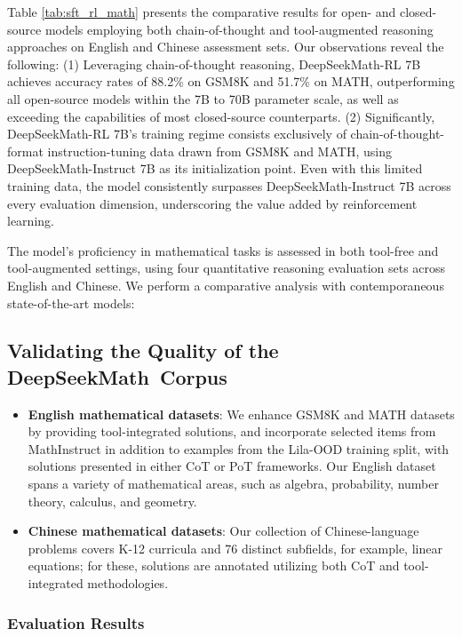 \begin{itemize}[topsep=0pt]
Table \ref{tab:sft_rl_math} presents the comparative results for open- and closed-source models employing both chain-of-thought and tool-augmented reasoning approaches on English and Chinese assessment sets. Our observations reveal the following: (1) Leveraging chain-of-thought reasoning, DeepSeekMath-RL 7B achieves accuracy rates of 88.2\% on GSM8K and 51.7\% on MATH, outperforming all open-source models within the 7B to 70B parameter scale, as well as exceeding the capabilities of most closed-source counterparts. (2) Significantly, DeepSeekMath-RL 7B's training regime consists exclusively of chain-of-thought-format instruction-tuning data drawn from GSM8K and MATH, using DeepSeekMath-Instruct 7B as its initialization point. Even with this limited training data, the model consistently surpasses DeepSeekMath-Instruct 7B across every evaluation dimension, underscoring the value added by reinforcement learning.

The model's proficiency in mathematical tasks is assessed in both tool-free and tool-augmented settings, using four quantitative reasoning evaluation sets across English and Chinese. We perform a comparative analysis with contemporaneous state-of-the-art models:

\subsection{Validating the Quality of the DeepSeekMath~Corpus}

\begin{itemize}[topsep=0pt]
    \item \textbf{English mathematical datasets}: We enhance GSM8K and MATH datasets by providing tool-integrated solutions, and incorporate selected items from MathInstruct \citep{MathInstruct} in addition to examples from the Lila-OOD \citep{lila} training split, with solutions presented in either CoT or PoT frameworks. Our English dataset spans a variety of mathematical areas, such as algebra, probability, number theory, calculus, and geometry.
    \item \textbf{Chinese mathematical datasets}: Our collection of Chinese-language problems covers K-12 curricula and 76 distinct subfields, for example, linear equations; for these, solutions are annotated utilizing both CoT and tool-integrated methodologies.
\end{itemize}

\subsubsection{Evaluation Results}


\end{itemize}

